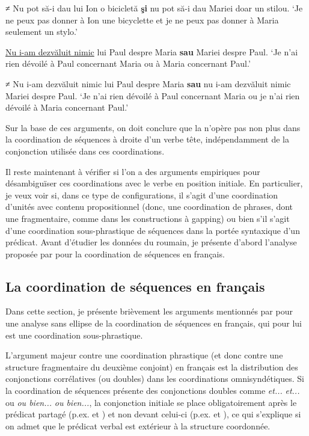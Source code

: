 \ex ≠ Nu pot să-i dau lui Ion o bicicletă \textbf{şi} nu pot să-i dau Mariei doar un stilou. \label{ch2:ex296b}
\glt ‘Je ne peux pas donner à Ion une bicyclette et je ne peux pas donner à Maria seulement un stylo.’ 
\z
\z


\ea \label{ch2:ex297}
\ea \uline{Nu i-am dezvăluit nimic} lui Paul despre Maria \textbf{sau} Mariei despre Paul. \label{ch2:ex297a}
\glt ‘Je n’ai rien dévoilé à Paul concernant Maria ou à Maria concernant Paul.’

\ex ≠ Nu i-am dezvăluit nimic lui Paul despre Maria \textbf{sau} nu i-am dezvăluit nimic Mariei despre Paul. \label{ch2:ex297b}
\glt ‘Je n’ai rien dévoilé à Paul concernant Maria ou je n’ai rien dévoilé à Maria concernant Paul.’ 
\z
\z

Sur la base de ces arguments, on doit conclure que la  n’opère pas non plus dans la coordination de séquences à droite d’un verbe tête, indépendamment de la conjonction utilisée dans ces coordinations.

Il reste maintenant à vérifier si l’on a des arguments empiriques pour désambiguïser ces coordinations avec le verbe en position initiale. En particulier, je veux voir si, dans ce type de configurations, il s’agit d’une coordination d’unités avec contenu propositionnel (donc, une coordination de phrases, dont une fragmentaire, comme dans les constructions à gapping) ou bien s’il s’agit d’une coordination sous-phrastique de séquences dans la portée syntaxique d’un prédicat. Avant d’étudier les données du roumain, je présente d’abord l’analyse proposée par \citet{Mouret2006,Mouret2007,Mouret2008} pour la coordination de séquences en français.


\subsection{La coordination de séquences en français} \label{ch2:sect2.6.2}


Dans cette section, je présente brièvement les arguments mentionnés par \citet{Mouret2006,Mouret2007,Mouret2008} pour une analyse sans ellipse de la coordination de séquences en français, qui pour lui est une coordination sous-phrastique. 

L’argument majeur contre une coordination phrastique (et donc contre une structure fragmentaire du deuxième conjoint) en français est la distribution des conjonctions corrélatives (ou doubles) dans les coordinations omnisyndétiques. Si la coordination de séquences présente des conjonctions doubles comme \textit{et...} \textit{et...} ou \textit{ou bien...} \textit{ou bien...}, la conjonction initiale se place obligatoirement après le prédicat partagé (p.ex.  et ) et non devant celui-ci (p.ex.  et ), ce qui s’explique si on admet que le prédicat verbal est extérieur à la structure coordonnée. 

